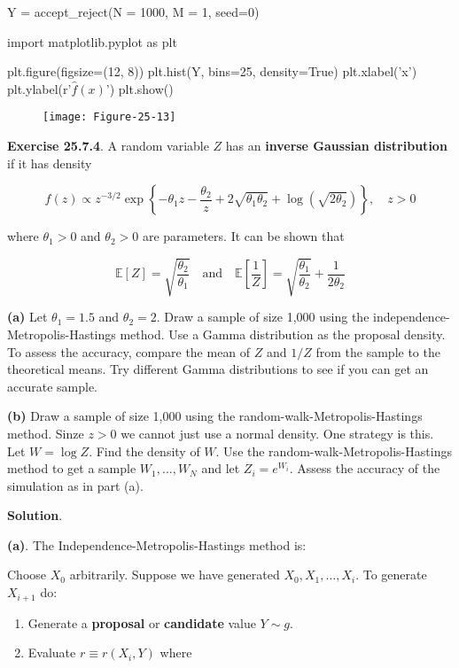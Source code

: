 \begin{python}
Y = accept_reject(N = 1000, M = 1, seed=0)

import matplotlib.pyplot as plt

plt.figure(figsize=(12, 8))
plt.hist(Y, bins=25, density=True)
plt.xlabel('x')
plt.ylabel(r'$\hat{f}(x)$')
plt.show()
\end{python}

\begin{figure}[H]
\centering
\texttt{[image: Figure-25-13]}
\end{figure}

\textbf{Exercise 25.7.4}. A random variable \(Z\) has an \textbf{inverse
Gaussian distribution} if it has density

\[ f(z) \propto z^{-3/2}  \exp \left\{ -\theta_{1} z - \frac{\theta_{2}}{z} + 2 \sqrt{\theta_{1} \theta_{2}}  + \log \left( \sqrt{2 \theta_{2}} \right) \right\}, \quad z > 0\]

where \(\theta_{1} > 0\) and \(\theta_{2} > 0\) are parameters. It can be
shown that

\[ 
\mathbb{E}[Z] = \sqrt{\frac{\theta_{2}}{\theta_{1}}} 
\quad \text{and} \quad
\mathbb{E}\left[ \frac{1}{Z} \right] = \sqrt{\frac{\theta_{1}}{\theta_{2}}} + \frac{1}{2 \theta_{2}}
\]

\textbf{(a)} Let \(\theta_{1} = 1.5\) and \(\theta_{2} = 2\). Draw a sample
of size 1,000 using the independence-Metropolis-Hastings method. Use a
Gamma distribution as the proposal density. To assess the accuracy,
compare the mean of \(Z\) and \(1 / Z\) from the sample to the
theoretical means. Try different Gamma distributions to see if you can
get an accurate sample.

\textbf{(b)} Draw a sample of size 1,000 using the
random-walk-Metropolis-Hastings method. Sinze \(z > 0\) we cannot just
use a normal density. One strategy is this. Let \(W = \log Z\). Find the
density of \(W\). Use the random-walk-Metropolis-Hastings method to get
a sample \(W_{1}, \dots, W_N\) and let \(Z_{i} = e^{W_{i}}\). Assess the
accuracy of the simulation as in part (a).

\textbf{Solution}.

\textbf{(a)}. The Independence-Metropolis-Hastings method is:

Choose \(X_{0}\) arbitrarily. Suppose we have generated
\(X_{0}, X_{1}, \dots, X_{i}\). To generate \(X_{i+1}\) do:

\begin{enumerate}[tightlist,label={\arabic*.}]
\item
  Generate a \textbf{proposal} or \textbf{candidate} value \(Y \sim g\).
\item
  Evaluate \(r \equiv r(X_{i}, Y)\) where
\end{enumerate}


